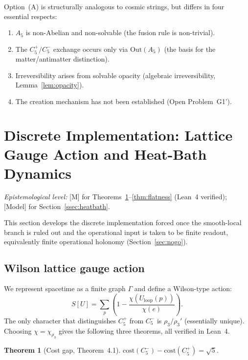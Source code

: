 \documentclass[sn-mathphys-num,Numbered]{sn-jnl}
\theoremstyle{thmstyleone}
\newtheorem{theorem}{Theorem}[section]
\theoremstyle{thmstylethree}
\theoremstyle{thmstyletwo}
\begin{document}
Option~(A) is structurally analogous to cosmic strings, but differs in
four essential respects:
\begin{enumerate}
  \item $A_5$ is non-Abelian and non-solvable (the fusion rule is
    non-trivial).
  \item The $C_5^+/C_5^-$ exchange occurs only via $\mathrm{Out}(A_5)$
    (the basis for the matter/antimatter distinction).
  \item Irreversibility arises from solvable opacity (algebraic
    irreversibility, Lemma~\ref{lem:opacity}).
  \item The creation mechanism has not been established (Open
    Problem~G1').
\end{enumerate}



\section{Discrete Implementation: Lattice Gauge Action and Heat-Bath Dynamics}
\label{sec:lattice}

\medskip
\noindent\textit{Epistemological level:} [M] for Theorems~\ref{thm:cost-gap}--\ref{thm:flatness} (Lean~4 verified); [Model] for Section~\ref{ssec:heatbath}.
\medskip

This section develops the discrete implementation forced once the
smooth-local branch is ruled out and the operational input is taken to
be finite readout, equivalently finite operational holonomy
(Section~\ref{sec:nogo}).

\subsection{Wilson lattice gauge action}
\label{ssec:wilson}

We represent spacetime as a finite graph $\Gamma$ and define a
Wilson-type action:
\begin{equation}
  S[U] = \sum_{p} \left(1 - \frac{\chi(U_{\mathrm{loop}}(p))}{\chi(e)}\right).
  \label{eq:wilson}
\end{equation}
The only character that distinguishes $C_5^+$ from $C_5^-$ is
$\rho_3/\rho_3'$ (essentially unique).  Choosing $\chi = \chi_{\rho_3}$
gives the following three theorems, all verified in Lean~4.

\begin{theorem}[Cost gap, Theorem~4.1]
\label{thm:cost-gap}
$\mathrm{cost}(C_5^-) - \mathrm{cost}(C_5^+) = \sqrt{5}$.
\end{theorem}
\end{document}
